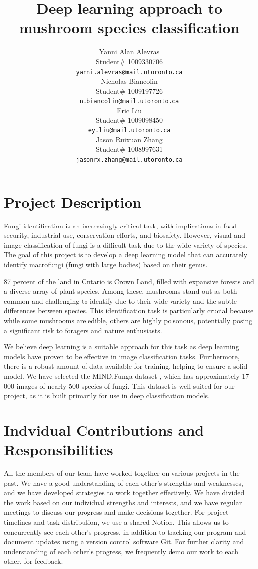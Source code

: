 \documentclass{article} %
\title{Deep learning approach to  \\ 
mushroom species classification}
\author{Yanni Alan Alevras  \\
Student\# 1009330706 \\
\texttt{yanni.alevras@mail.utoronto.ca} \\
\And
Nicholas Biancolin  \\
Student\# 1009197726 \\
\texttt{n.biancolin@mail.utoronto.ca} \\
\AND
Eric Liu  \\
Student\# 1009098450 \\
\texttt{ey.liu@mail.utoronto.ca} \\
\And
Jason Ruixuan Zhang \\
Student\# 1008997631 \\
\texttt{jasonrx.zhang@mail.utoronto.ca} \\
\AND
}
\begin{document}
\maketitle

\section{Project Description}
\label{sec:project_description}

Fungi identification is an increasingly critical task, with implications in food security, industrial use, conservation efforts, and biosafety. However, visual and image classification of fungi is a difficult task due to the wide variety of species. The goal of this project is to develop a deep learning model that can accurately identify macrofungi (fungi with large bodies) based on their genus. 

87 percent of the land in Ontario is Crown Land, filled with expansive forests and a diverse array of plant species. Among these, mushrooms stand out as both common and challenging to identify due to their wide variety and the subtle differences between species. This identification task is particularly crucial because while some mushrooms are edible, others are highly poisonous, potentially posing a significant risk to foragers and nature enthusiasts.

We believe deep learning is a suitable approach for this task as deep learning models have proven to be effective in image classification tasks. Furthermore, there is a robust amount of data available for training, helping to ensure a solid model. We have selected the MIND.Funga dataset \citep{Drechsler-SantosKarstedtEtAl.MINDFunga.2023}, which has approximately 17 000 images of nearly 500 species of fungi. This dataset is well-suited for our project, as it is built primarily for use in deep classification models.


\section{Indvidual Contributions and Responsibilities}
\label{sec:individual_contributions_and_responsibilities}

All the members of our team have worked together on various projects in the past. We have a good understanding of each other's strengths and weaknesses, and we have developed strategies to work together effectively. We have divided the work based on our individual strengths and interests, and we have regular meetings to discuss our progress and make decisions together. For project timelines and task distribution, we use a shared Notion. This allows us to concurrently see each other's progress, in addition to tracking our program and document updates using a version control software Git. For further clarity and understanding of each other's progress, we frequently demo our work to each other, for feedback.
\end{document}
